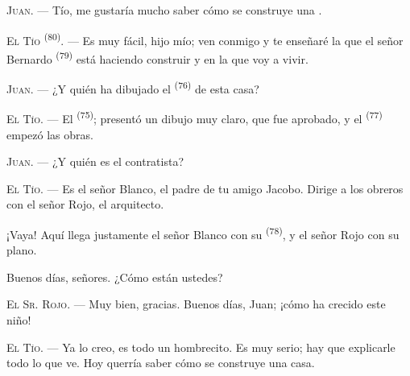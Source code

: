 %

\VUsaut{6.0mm}
\VUsaut{1.4mm}
\VUsaut{2.2mm}

\VUsaut{3.0mm}

\textsc{Juan}. --- Tío, me gustaría mucho saber cómo se construye una
.

\textsc{El Tío} \textsuperscript{(80)}. --- Es muy fácil, hijo mío; ven conmigo y
te enseñaré la que el señor Bernardo \textsuperscript{(79)} está haciendo
construir y en la que voy a vivir.

\textsc{Juan}. --- ¿Y quién ha dibujado el  \textsuperscript{(76)} de
esta casa?

\textsc{El Tío}. --- El  \textsuperscript{(75)}; presentó un dibujo
muy claro, que fue aprobado, y el  \textsuperscript{(77)}
empezó las obras.

\textsc{Juan}. --- ¿Y quién es el contratista?

\textsc{El Tío}. --- Es el señor Blanco, el padre de tu amigo Jacobo.
Dirige a los obreros con el señor Rojo, el arquitecto.

¡Vaya! Aquí llega justamente el señor Blanco con su 
\textsuperscript{(78)}, y el señor Rojo con su plano.

Buenos días, señores. ¿Cómo están ustedes?

\textsc{El Sr. Rojo}. --- Muy bien, gracias. Buenos días, Juan; ¡cómo ha
crecido este niño!

\textsc{El Tío}. --- Ya lo creo, es todo un hombrecito. Es muy serio; hay
que explicarle todo lo que ve. Hoy querría saber cómo se construye una
casa.

